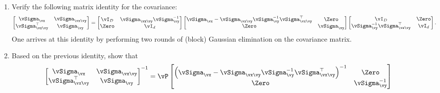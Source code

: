\documentclass[../../book-main.tex]{subfiles}
\begin{document}
\begin{exercise}
    \begin{enumerate}
        \item Verify the following matrix identity for the covariance:
            \begin{equation}\label{eq:gaussian-conditional-covariance-block}
                \begin{bmatrix}
                    \vSigma_{\vx} & \vSigma_{\vx\vy} \\
                    \vSigma_{\vx\vy}^\top & \vSigma_{\vy}
                \end{bmatrix}
                =
                \begin{bmatrix}
                    \vI_D & \vSigma_{\vx\vy}\vSigma_{\vy}^{-1} \\
                    \Zero & \vI_d
                \end{bmatrix}
                \begin{bmatrix}
                    \vSigma_{\vx} - \vSigma_{\vx\vy} \vSigma_{\vy}^{-1}
                    \vSigma_{\vx\vy}^{\top} & \Zero \\
                    \Zero & \vSigma_{\vy}
                \end{bmatrix}
                \begin{bmatrix}
                    \vI_D & \Zero\\
                    \vSigma_{\vy}^{-1}\vSigma_{\vx\vy}^\top & \vI_d
                \end{bmatrix}.
            \end{equation}
            One arrives at this identity by performing two rounds of
            (block) Gaussian
            elimination on the covariance matrix.
        \item Based on the previous identity, show that
            \begin{equation}\label{eq:gaussian-conditional-covariance-inverse-block}
                \begin{bmatrix}
                    \vSigma_{\vx} & \vSigma_{\vx\vy} \\
                    \vSigma_{\vx\vy}^\top & \vSigma_{\vy}
                \end{bmatrix}^{-1}
                =
                \vP
                \begin{bmatrix}
                    \left(\vSigma_{\vx} - \vSigma_{\vx\vy}
                        \vSigma_{\vy}^{-1}
                    \vSigma_{\vx\vy}^{\top}\right)^{-1} & \Zero \\
                    \Zero & \vSigma_{\vy}^{-1}

\end{bmatrix}
\end{equation}
\end{enumerate}
\end{exercise}
\end{document}
